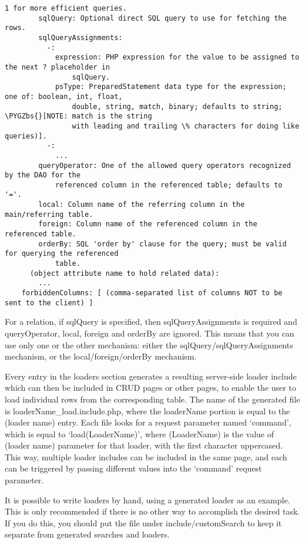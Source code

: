 \documentclass[letterpaper,10pt,english]{sphinxmanual}
\def\PYGZbs{\char`\\}
\begin{document}
\begin{Verbatim}[commandchars=\\\{\}]
            1 for more efficient queries.
        sqlQuery: Optional direct SQL query to use for fetching the rows.
        sqlQueryAssignments:
          -:
            expression: PHP expression for the value to be assigned to the next ? placeholder in
                sqlQuery.
            psType: PreparedStatement data type for the expression; one of: boolean, int, float,
                double, string, match, binary; defaults to string; \PYGZbs{}[NOTE: match is the string
                with leading and trailing \% characters for doing like queries)].
          -:
            ...
        queryOperator: One of the allowed query operators recognized by the DAO for the
            referenced column in the referenced table; defaults to '='.
        local: Column name of the referring column in the main/referring table.
        foreign: Column name of the referenced column in the referenced table.
        orderBy: SQL 'order by' clause for the query; must be valid for querying the referenced
            table.
      (object attribute name to hold related data):
        ...
    forbiddenColumns: [ (comma-separated list of columns NOT to be sent to the client) ]
\end{Verbatim}

For a relation, if sqlQuery is specified, then sqlQueryAssignments is required and queryOperator,
local, foreign and orderBy are ignored.  This means that you can use only one or the other
mechanism: either the sqlQuery/sqlQueryAssignments mechanism, or the local/foreign/orderBy
mechanism.

Every entry in the loaders section generates a resulting server-side loader include which can then
be included in CRUD pages or other pages, to enable the user to load individual rows from the
corresponding table.  The name of the generated file is loaderName\_load.include.php, where the
loaderName portion is equal to the (loader name) entry.  Each file looks for a request parameter
named `command', which is equal to `load(LoaderName)', where (LoaderName) is the value of (loader
name) parameter for that loader, with the first character uppercased.  This way, multiple loader
includes can be included in the same page, and each can be triggered by passing different values
into the `command' request parameter.

It is possible to write loaders by hand, using a generated loader as an example.  This is only
recommended if there is no other way to accomplish the desired task.  If you do this, you should put
the file under include/customSearch to keep it separate from generated searches and loaders.
\end{document}

